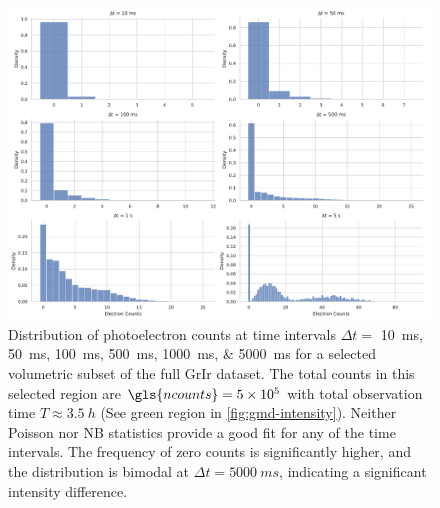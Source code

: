 \begin{figure}
    \centering
    \includegraphics[width=1\linewidth]{images/hist_counts_facetgrid_2_grir.pdf}
    \caption{Distribution of photoelectron counts at time intervals $\Delta t =$ \qtylist{10;50;100;500;1000;5000}{ms} for a selected volumetric subset of the full \gls{GrIr} dataset. The total counts in this selected region are $\gls{ncounts}=\num{5e5}$ with total observation time $T\approx\qty{3.5}{h}$  (See green region in \cref{fig:gmd-intensity}). Neither Poisson nor \gls{NB} statistics provide a good fit for any of the time intervals. The frequency of zero counts is significantly higher, and the distribution is bimodal at $\Delta t = \qty{5000}{ms}$, indicating a significant intensity difference.}
    \label{fig:grir-stats-2}
\end{figure}



